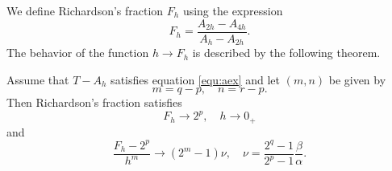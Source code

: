 \documentclass[runningheads]{llncs}
\begin{document}
We define Richardson's fraction $F_h$ using the expression
\begin{equation}
  F_h = \frac{A_{2h} - A_{4h}}{A_h - A_{2h}}.
\end{equation}
The behavior of the function $h \rightarrow F_h$ is described by the following theorem.
\begin{theorem} Assume that $T-A_h$ satisfies equation \eqref{equ:aex} and let $(m,n)$ be given by
  \begin{equation}
    m = q - p, \quad n = r - p.
  \end{equation}
  Then Richardson's fraction satisfies
  \begin{equation}
    F_h \rightarrow 2^p, \quad h \rightarrow 0_+
  \end{equation}
  and 
  \begin{equation}
    \frac{F_h - 2^p}{h^m} \rightarrow (2^m-1) \nu, \quad \nu = \frac{2^q-1}{2^p-1} \frac{\beta}{\alpha}.
    \end{equation}
\end{theorem}
\end{document}
